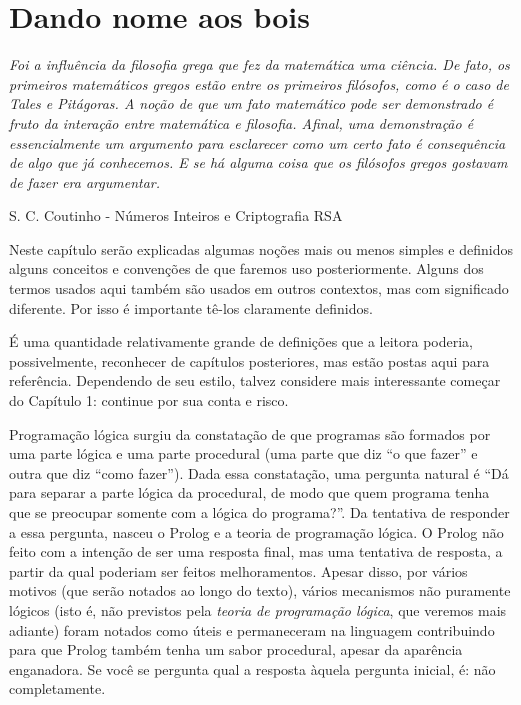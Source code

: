 \documentclass{article}
\theoremstyle{remark}
\begin{document}
\section{Dando nome aos bois}

\epigraph{\textit{Foi a influência da filosofia grega que fez da matemática uma ciência. De fato, os primeiros matemáticos gregos estão entre os primeiros filósofos, como é o caso de Tales e Pitágoras. A noção de que um fato matemático pode ser demonstrado é fruto da interação entre matemática e filosofia. Afinal, uma demonstração é essencialmente um argumento para esclarecer como um certo fato é consequência de algo que já conhecemos. E se há alguma coisa que os filósofos gregos gostavam de
    fazer era argumentar.}}{S. C. Coutinho - Números Inteiros e Criptografia RSA}


Neste capítulo serão explicadas algumas noções mais ou menos simples e definidos alguns conceitos e convenções de que faremos uso posteriormente. Alguns dos termos usados aqui também são usados em outros contextos, mas com significado diferente. Por isso é importante tê-los claramente definidos.

É uma quantidade relativamente grande de definições que a leitora poderia, possivelmente, reconhecer de capítulos posteriores, mas estão postas aqui para referência. Dependendo de seu estilo, talvez considere mais interessante começar do Capítulo 1: continue por sua conta e risco. %

Programação lógica surgiu da constatação de que programas são formados por uma parte lógica e uma parte procedural (uma parte que diz ``o que fazer'' e outra que diz ``como fazer''). Dada essa constatação, uma pergunta natural é ``Dá para separar a parte lógica da procedural, de modo que quem programa tenha que se preocupar somente com a lógica do programa?''. Da tentativa de responder a essa pergunta, nasceu o Prolog e a teoria de programação lógica. O Prolog não
feito com a intenção de ser uma resposta final, mas uma tentativa de resposta, a partir da qual poderiam ser feitos
melhoramentos. Apesar disso, por vários motivos (que serão notados ao longo do texto), vários mecanismos não puramente lógicos (isto é, não previstos pela \textit{teoria de programação lógica}, que veremos mais adiante) foram notados como úteis e permaneceram na linguagem contribuindo para que Prolog também tenha um sabor procedural, apesar da aparência enganadora. Se você se pergunta qual a resposta àquela pergunta inicial, é: não completamente.
\end{document}
